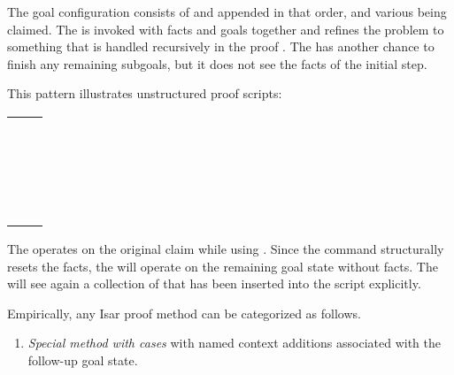 \begin{isabellebody}
\begin{isamarkuptext}
  The goal configuration consists of  and
   appended in that order, and various  being claimed.  The  is invoked
  with facts and goals together and refines the problem to something
  that is handled recursively in the proof .  The  has another chance to finish any remaining
  subgoals, but it does not see the facts of the initial step.

  \medskip This pattern illustrates unstructured proof scripts:

  \medskip
  \begin{tabular}{l}
  \hyperlink{command.have}{\mbox{\isa{\isacommand{have}}}}~\isa{props} \\
  \quad\hyperlink{command.using}{\mbox{\isa{\isacommand{using}}}}~\isa{facts\isactrlsub {\isadigit{1}}}~\hyperlink{command.apply}{\mbox{\isa{\isacommand{apply}}}}~\isa{method\isactrlsub {\isadigit{1}}} \\
  \quad\hyperlink{command.apply}{\mbox{\isa{\isacommand{apply}}}}~\isa{method\isactrlsub {\isadigit{2}}} \\
  \quad\hyperlink{command.using}{\mbox{\isa{\isacommand{using}}}}~\isa{facts\isactrlsub {\isadigit{3}}}~\hyperlink{command.apply}{\mbox{\isa{\isacommand{apply}}}}~\isa{method\isactrlsub {\isadigit{3}}} \\
  \quad\hyperlink{command.done}{\mbox{\isa{\isacommand{done}}}} \\
  \end{tabular}
  \medskip

  The  operates on the original claim while
  using .  Since the \hyperlink{command.apply}{\mbox{}} command
  structurally resets the facts, the  will
  operate on the remaining goal state without facts.  The  will see again a collection of  that has been inserted into the script explicitly.

  \medskip Empirically, any Isar proof method can be categorized as
  follows.

  \begin{enumerate}

  \item \emph{Special method with cases} with named context additions
  associated with the follow-up goal state.


\end{enumerate}
\end{isamarkuptext}
\end{isabellebody}
